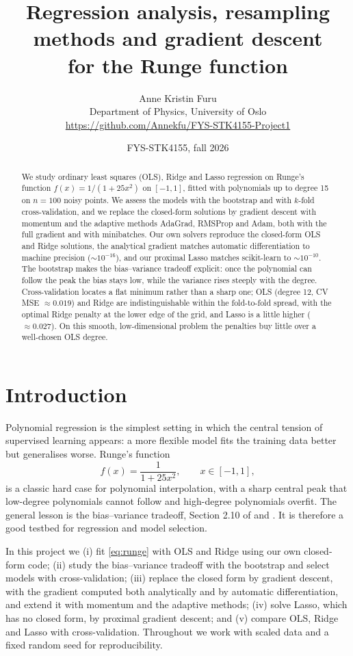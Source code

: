\documentclass[a4paper,11pt]{article}
\title{Regression analysis, resampling methods and gradient descent\\
for the Runge function}
\author{Anne Kristin Furu\\
\small Department of Physics, University of Oslo\\
\small \url{https://github.com/Annekfu/FYS-STK4155-Project1}}
\date{FYS-STK4155, fall 2026}
\begin{document}
\maketitle

\begin{abstract}
\noindent
We study ordinary least squares (OLS), Ridge and Lasso regression on Runge's
function $f(x)=1/(1+25x^2)$ on $[-1,1]$, fitted with polynomials up to degree
15 on $n=100$ noisy points. We assess the models with the bootstrap and with
$k$-fold cross-validation, and we replace the closed-form solutions by gradient
descent with momentum and the adaptive methods AdaGrad, RMSProp and Adam, both
with the full gradient and with minibatches. Our own solvers reproduce the
closed-form OLS and Ridge solutions, the analytical gradient matches automatic
differentiation to machine precision ($\sim 10^{-16}$), and our proximal Lasso
matches scikit-learn to $\sim 10^{-10}$. The bootstrap makes the bias--variance
tradeoff explicit: once the polynomial can follow the peak the bias stays low,
while the variance rises steeply with the degree. Cross-validation locates a
flat minimum rather than a sharp one; OLS (degree 12, CV MSE $\approx 0.019$)
and Ridge are indistinguishable within the fold-to-fold spread, with the
optimal Ridge penalty at the lower edge of the grid, and Lasso is a little higher
($\approx 0.027$). On this smooth, low-dimensional problem the penalties buy
little over a well-chosen OLS degree.
\end{abstract}

\section{Introduction}
Polynomial regression is the simplest setting in which the central tension of
supervised learning appears: a more flexible model fits the training data
better but generalises worse. Runge's function
\begin{equation}
f(x)=\frac{1}{1+25x^2}, \qquad x\in[-1,1],
\label{eq:runge}
\end{equation}
is a classic hard case for polynomial interpolation, with a
sharp central peak that low-degree polynomials cannot follow and high-degree
polynomials overfit. The general lesson is the bias--variance tradeoff, Section
2.10 of \cite{hjorthjensen2026} and \cite{hastie2009}. It is therefore a good
testbed for regression and model selection.

In this project we (i) fit \eqref{eq:runge} with OLS and Ridge using our own
closed-form code; (ii) study the bias--variance tradeoff with the bootstrap and
select models with cross-validation; (iii) replace the closed form by gradient
descent, with the gradient computed both analytically and by automatic
differentiation, and extend it with momentum and the adaptive methods; (iv)
solve Lasso, which has no closed form, by proximal gradient descent; and (v)
compare OLS, Ridge and Lasso with cross-validation. Throughout we work with
scaled data and a fixed random seed for reproducibility.
\end{document}
